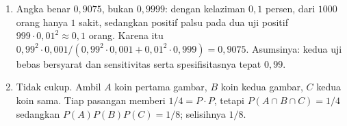 \begin{enumerate}[label=\textbf{17.\arabic*}]
  \item 
Angka benar $0{,}9075$, bukan $0{,}9999$: dengan kelaziman $0{,}1$ persen,
        dari $1000$ orang hanya $1$ sakit, sedangkan positif palsu pada dua uji
        positif $999\cdot0{,}01^{2}\approx0{,}1$ orang. Karena itu
        $0{,}99^{2}\cdot0{,}001/(0{,}99^{2}\cdot0{,}001+0{,}01^{2}\cdot0{,}999)=0{,}9075$.
        Asumsinya: kedua uji bebas bersyarat dan sensitivitas serta spesifisitasnya
        tepat $0{,}99$.

  \item Tidak cukup. Ambil $A$ koin pertama gambar, $B$ koin kedua gambar, $C$ kedua
        koin sama. Tiap pasangan memberi $1/4=P\cdot P$, tetapi
        $P(A\cap B\cap C)=1/4$ sedangkan $P(A)P(B)P(C)=1/8$; selisihnya $1/8$.
\end{enumerate}


